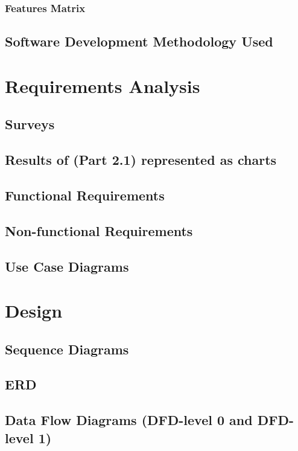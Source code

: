 \documentclass{book}
\begin{document}
			\subsection{Features Matrix}
			
		\section{Software Development Methodology Used}
	
	\chapter{Requirements Analysis}
		\section{Surveys}
		
		\section{Results of (Part 2.1) represented as charts}
		
		\section{Functional Requirements}
		
		\section{Non-functional Requirements}
		
		\section{Use Case Diagrams}
	
	\chapter{Design}
		\section{Sequence Diagrams}
		
		\section{ERD}
		
		\section{Data Flow Diagrams (DFD-level 0 and DFD-level 1)}
		
\end{document}
